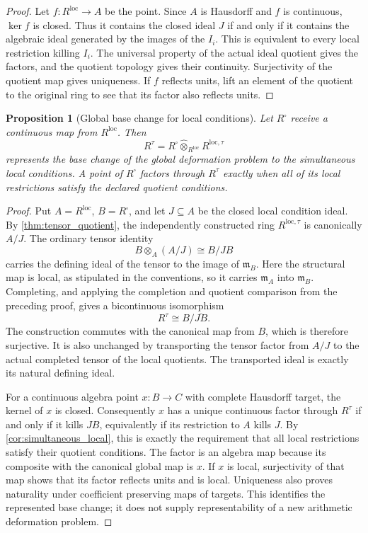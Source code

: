\documentclass[11pt]{amsart}
\newtheorem{proposition}[proposition]{Proposition}
\theoremstyle{definition}
\theoremstyle{remark}
\newcommand{\frakm}{\mathfrak m}
\newcommand{\wideotimes}{\mathbin{\widehat\otimes}}
\begin{document}
\begin{proof}
Let \(f:R^{\mathrm{loc}}\to A\) be the point. Since \(A\) is Hausdorff and \(f\) is continuous, \(\ker f\) is closed. Thus it contains the closed ideal \(J\) if and only if it contains the algebraic ideal generated by the images of the \(I_i\). This is equivalent to every local restriction killing \(I_i\). The universal property of the actual ideal quotient gives the factors, and the quotient topology gives their continuity. Surjectivity of the quotient map gives uniqueness. If \(f\) reflects units, lift an element of the quotient to the original ring to see that its factor also reflects units.
\end{proof}

\begin{proposition}[Global base change for local conditions]\label{prop:global_local_basechange}
Let \(R^\square\) receive a continuous map from \(R^{\mathrm{loc}}\). Then
\[
R^{\tau}
=
R^\square\wideotimes_{R^{\mathrm{loc}}}R^{\mathrm{loc},\tau}
\]
represents the base change of the global deformation problem to the simultaneous local conditions. A point of \(R^\square\) factors through \(R^{\tau}\) exactly when all of its local restrictions satisfy the declared quotient conditions.
\end{proposition}

\begin{proof}
Put \(A=R^{\mathrm{loc}}\), \(B=R^\square\), and let \(J\subseteq A\) be the closed local condition ideal. By \cref{thm:tensor_quotient}, the independently constructed ring \(R^{\mathrm{loc},\tau}\) is canonically \(A/J\). The ordinary tensor identity
\[
B\otimes_A(A/J)\cong B/JB
\]
carries the defining ideal of the tensor to the image of \(\frakm_B\). Here the structural map is local, as stipulated in the conventions, so it carries \(\frakm_A\) into \(\frakm_B\). Completing, and applying the completion and quotient comparison from the preceding proof, gives a bicontinuous isomorphism
\[
R^\tau\cong B/\overline{JB}.
\]
The construction commutes with the canonical map from \(B\), which is therefore surjective. It is also unchanged by transporting the tensor factor from \(A/J\) to the actual completed tensor of the local quotients. The transported ideal is exactly its natural defining ideal.

For a continuous algebra point \(x:B\to C\) with complete Hausdorff target, the kernel of \(x\) is closed. Consequently \(x\) has a unique continuous factor through \(R^\tau\) if and only if it kills \(JB\), equivalently if its restriction to \(A\) kills \(J\). By \cref{cor:simultaneous_local}, this is exactly the requirement that all local restrictions satisfy their quotient conditions. The factor is an algebra map because its composite with the canonical global map is \(x\). If \(x\) is local, surjectivity of that map shows that its factor reflects units and is local. Uniqueness also proves naturality under coefficient preserving maps of targets. This identifies the represented base change; it does not supply representability of a new arithmetic deformation problem.
\end{proof}
\end{document}
